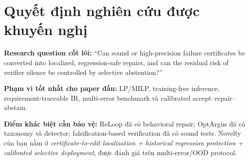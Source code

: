 \documentclass[11pt,a4paper]{article}
\begin{document}
\section{Quyết định nghiên cứu được khuyến nghị}

\begin{takeaway}
\textbf{Research question cốt lõi:} ``Can sound or high-precision failure certificates be converted into localized, regression-safe repairs, and can the residual risk of verifier silence be controlled by selective abstention?''

\textbf{Phạm vi tốt nhất cho paper đầu:} LP/MILP, training-free inference, requirement-traceable IR, multi-error benchmark và calibrated accept--repair--abstain.

\textbf{Điểm khác biệt cần bảo vệ:} ReLoop đã có behavioral repair; OptArgus đã có taxonomy và detector; falsification-based verification đã có sound tests. Novelty của bạn nằm ở \emph{certificate-to-edit localization + historical regression protection + calibrated selective deployment}, được đánh giá trên multi-error/OOD protocol.
\end{takeaway}

\printbibliography[title={Tài liệu tham khảo}]
\end{document}
